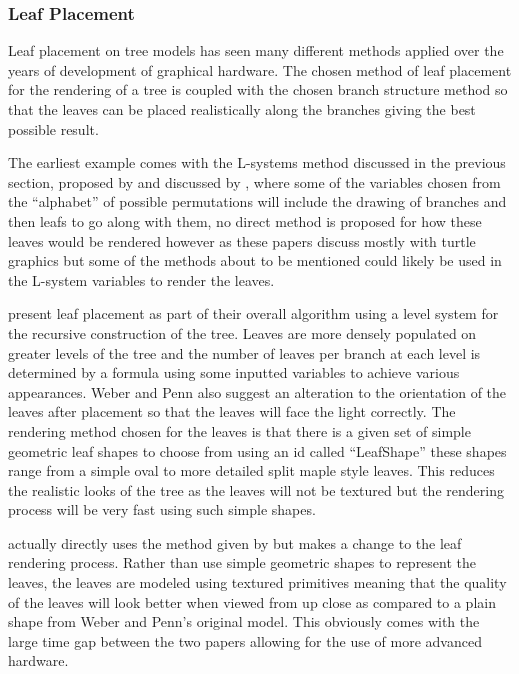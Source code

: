 \documentclass[review]{cmpreport}
\begin{document}
\subsubsection{Leaf Placement}
Leaf placement on tree models has seen many different methods applied over the years 
of development of graphical hardware. The chosen method of leaf placement for the 
rendering of a tree is coupled with the chosen branch structure method so that the 
leaves can be placed realistically along the branches giving the best possible result. \par
The earliest example comes with the L-systems method discussed in the previous section, 
proposed by \cite{lindenmayer1968mathematical} and discussed by \cite{prusinkiewicz1996systems}, 
where some of the variables chosen from the ``alphabet'' of possible permutations will 
include the drawing of branches and then leafs to go along with them, no direct method is 
proposed for how these leaves would be rendered however as these papers discuss mostly with 
turtle graphics but some of the methods about to be mentioned could likely be used in 
the L-system variables to render the leaves. \par
\cite{weber1995rendering} present leaf placement as part of their overall algorithm using 
a level system for the recursive construction of the tree. Leaves are more densely populated 
on greater levels of the tree and the number of leaves per branch at each level is determined 
by a formula using some inputted variables to achieve various appearances. Weber and Penn 
also suggest an alteration to the orientation of the leaves after placement so that the leaves 
will face the light correctly. The rendering method chosen for the leaves is that there is a 
given set of simple geometric leaf shapes to choose from using an id called ``LeafShape'' 
these shapes range from a simple oval to more detailed split maple style leaves. This reduces 
the realistic looks of the tree as the leaves will not be textured but the rendering process 
will be very fast using such simple shapes. \par
\cite{wesslen2005real} actually directly uses the method given by \cite{weber1995rendering} 
but makes a change to the leaf rendering process. Rather than use simple geometric shapes 
to represent the leaves, the leaves are modeled using textured primitives meaning that the 
quality of the leaves will look better when viewed from up close as compared to a plain 
shape from Weber and Penn's original model. This obviously comes with the large time gap 
between the two papers allowing for the use of more advanced hardware. \par
\end{document}
